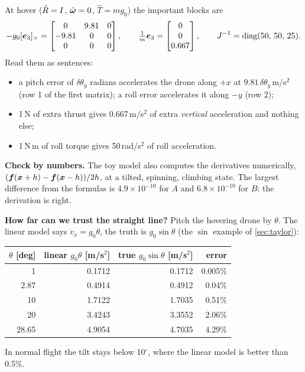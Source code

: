 \begin{toy}
At hover ($\hat{R}=I$, $\hat{\bm\omega}=0$, $\hat T=mg_0$) the important blocks are
\[
-g_0[\bm{e}_3]_{\times}=\begin{bmatrix}0&9.81&0\\-9.81&0&0\\0&0&0\end{bmatrix},\qquad
\tfrac1m\bm{e}_3=\begin{bmatrix}0\\0\\0.667\end{bmatrix},\qquad
J^{-1}=\operatorname{diag}(50,\,50,\,25).
\]
Read them as sentences:
\begin{itemize}
  \item a pitch error of $\delta\theta_y$ radians accelerates the drone along $+x$ at $9.81\,\delta\theta_y$\,m/s$^2$
        (row 1 of the first matrix); a roll error accelerates it along $-y$ (row 2);
  \item 1\,N of extra thrust gives 0.667\,m/s$^2$ of extra \emph{vertical} acceleration and nothing else;
  \item 1\,N\,m of roll torque gives 50\,rad/s$^2$ of roll acceleration.
\end{itemize}
\textbf{Check by numbers.} The toy model also computes the derivatives numerically, $(\bm{f}(\bm{x}+h)-\bm{f}(\bm{x}-h))/2h$,
at a tilted, spinning, climbing state. The largest difference from the formulas is $4.9\times10^{-10}$ for $A$ and
$6.8\times10^{-10}$ for $B$: the derivation is right.

\textbf{How far can we trust the straight line?} Pitch the hovering drone by $\theta$. The linear model says
$\dot v_x=g_0\theta$, the truth is $g_0\sin\theta$ (the $\sin$ example of \cref{sec:taylor}):
\begin{center}\small
\begin{tabular}{rrrr}
\toprule
$\theta$ [deg] & linear $g_0\theta$ [m/s$^2$] & true $g_0\sin\theta$ [m/s$^2$] & error\\
\midrule
1 & 0.1712 & 0.1712 & 0.005\%\\
2.87 & 0.4914 & 0.4912 & 0.04\%\\
10 & 1.7122 & 1.7035 & 0.51\%\\
20 & 3.4243 & 3.3552 & 2.06\%\\
28.65 & 4.9054 & 4.7035 & 4.29\%\\
\bottomrule
\end{tabular}
\end{center}
In normal flight the tilt stays below 10$^\circ$, where the linear model is better than 0.5\%.
\end{toy}

